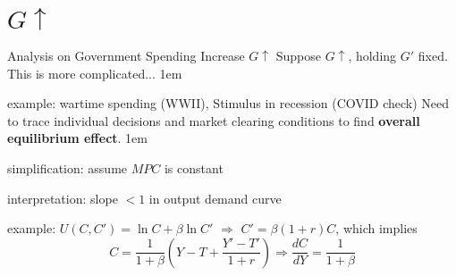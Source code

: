 \documentclass[11pt,aspectratio=43]{beamer}
\let\olditemize=\itemize
\let\endolditemize=\enditemize
\renewenvironment{itemize}{\olditemize \itemsep1em}{\endolditemize}
\theoremstyle{definition}
\begin{document}
\section{$G \uparrow $}
\label{sec:_G__uparrow__}

\begin{frame}{Analysis on Government Spending Increase $ G \uparrow  $}
\label{slide:Analysis_on_Government_Spending_Increase___G__uparrow___}
    Suppose $ G \uparrow  $, holding $ G' $ fixed. This is more complicated...
    \begin{itemize}
        \item \alert{example}: wartime spending (WWII), Stimulus in recession (COVID check)
    \end{itemize}
    Need to trace individual decisions and market clearing conditions to find \textbf{overall equilibrium effect}.
    \begin{itemize}
        \item \alert{simplification}: assume $ MPC $ is constant
        \item \alert{interpretation}: slope $ <1 $ in output demand curve
        \item \alert{example}: $ U( C, C' ) = \ln C + \beta \ln C' $ $ \Rightarrow  $ $ C' = \beta ( 1+r ) C $, which implies
        \begin{equation*}
            C = \frac{1}{1+\beta} \left(
                Y - T + \frac{Y' - T'}{1+r}
            \right)
            \Rightarrow  \frac{dC}{dY} = \frac{1}{1+\beta}
        \end{equation*}
    \end{itemize}
\end{frame}
\end{document}
